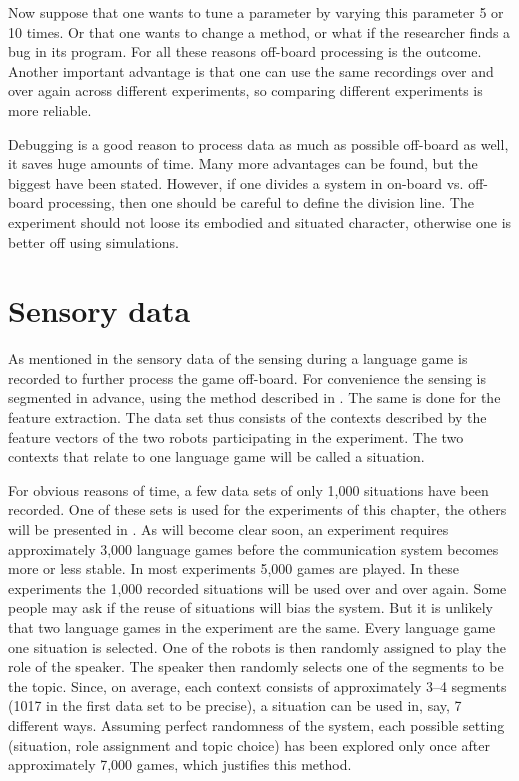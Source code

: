 Now suppose that one wants to tune a parameter by varying this parameter 5 or 10 times. Or that one wants to change a method, or what if the researcher finds a bug in its program. For all these reasons off-board processing is the outcome. Another important advantage is that one can use the same recordings over and over again across different experiments, so comparing different experiments is more reliable.

Debugging is a good reason to process data as much as possible off-board as well, it saves huge amounts of time. Many more advantages can be found, but the biggest have been stated. However, if one divides a system in on-board vs. off-board processing, then one should be careful to define the division line. The experiment should not loose its embodied and situated character, otherwise one is better off using simulations.

\section{Sensory data}\label{s:st:data}

As mentioned in  the sensory data of the
sensing during a language game is recorded to further
process the game off-board. For convenience the sensing is segmented in advance, using the method
described in . The same is done for the feature extraction. The data set thus consists of
the contexts described by the feature vectors of the two robots participating in the experiment. The two contexts that relate to one language game will be called a {\sc situation}.

For obvious reasons of time, a few data sets of only 1,000
situations have been recorded. One of these sets is used for the experiments of this chapter, the others will be presented in . As will become clear soon,
an experiment requires approximately 3,000 language
games before the communication system becomes more or less stable. In most experiments 5,000 games are played. In these experiments the
1,000 recorded situations will be used over and over again. Some people may ask if the reuse of situations will bias the system. But it is unlikely that two language games in the experiment are the same.
Every language game one situation is selected. One of the
robots is then randomly assigned to play the role of the
speaker. The speaker then randomly selects one of the segments
to be the topic. Since, on average, each context consists
of approximately 3--4 segments (1017 in the first data set to be
precise), a situation can be used in, say, 7 different ways. Assuming
perfect randomness of the system, each possible setting
(situation, role assignment and topic choice) has been explored only once
after approximately 7,000 games, which justifies this method. 


